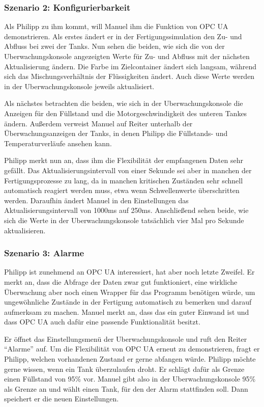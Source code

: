 \documentclass[parskip=full]{scrartcl}
\begin{document}
\subsubsection{Szenario 2: Konfigurierbarkeit}
Als Philipp zu ihm kommt, will Manuel ihm die Funktion von \gls{OPC UA} demonstrieren.
Als erstes ändert er in der \gls{Fertigungssimulation} den Zu- und Abfluss bei zwei der Tanks. Nun sehen die beiden, wie
sich die von der \gls{Uberwachungskonsole} angezeigten Werte für Zu- und Abfluss mit der nächsten Aktualisierung ändern. Die
Farbe im Zielcontainer ändert sich langsam, während sich das Mischungsverhältnis der Flüssigkeiten ändert. Auch diese
Werte werden in der \gls{Uberwachungskonsole} jeweils aktualisiert.

Als nächstes betrachten die beiden, wie sich in der \gls{Uberwachungskonsole} die Anzeigen für den Füllstand und die
Motorgeschwindigkeit des unteren Tankes ändern.
Außerdem verweist Manuel auf Reiter unterhalb der Überwachungsanzeigen der Tanks,
in denen Philipp die Füllstands- und Temperaturverläufe ansehen kann.

Philipp merkt nun an, dass ihm die Flexibilität der empfangenen Daten sehr gefällt. Das Aktualisierungsintervall von
einer Sekunde sei aber in manchen der Fertigungsprozesse zu lang, da in manchen kritischen Zuständen sehr schnell
automatisch reagiert werden muss, etwa wenn Schwellenwerte überschritten werden. Daraufhin ändert Manuel in den
Einstellungen das Aktualisierungsintervall von 1000ms auf 250ms. Anschließend sehen beide, wie sich die Werte in der
\gls{Uberwachungskonsole} tatsächlich vier Mal pro Sekunde aktualisieren.

\subsubsection{Szenario 3: Alarme}
Philipp ist zunehmend an \gls{OPC UA} interessiert, hat aber noch letzte Zweifel. Er merkt an, dass die Abfrage der Daten
zwar gut funktioniert, eine wirkliche \"Uberwachung aber noch einen \gls{Wrapper} f\"ur das Programm ben\"otigen w\"urde,
um ungew\"ohnliche Zust\"ande in der Fertigung automatisch zu bemerken und darauf aufmerksam zu machen.
Manuel merkt an, dass das ein guter Einwand ist und dass \gls{OPC UA} auch daf\"ur eine passende Funktionalit\"at besitzt.

Er \"offnet das Einstellungsmen\"u der \gls{Uberwachungskonsole} und ruft den Reiter "`Alarme"' auf. Um die Flexibilit\"at
von \gls{OPC UA} erneut zu demonstrieren, fragt er Philipp, welchen vorhandenen Zustand er gerne abfangen w\"urde. Philipp möchte gerne
wissen, wenn ein Tank \"uberzulaufen droht. Er schl\"agt daf\"ur als Grenze einen F\"ullstand von 95\% vor.
Manuel gibt also in der \gls{Uberwachungskonsole} 95\% als Grenze an und w\"ahlt einen Tank, f\"ur den der Alarm stattfinden soll.
Dann speichert er die neuen Einstellungen.
\end{document}
